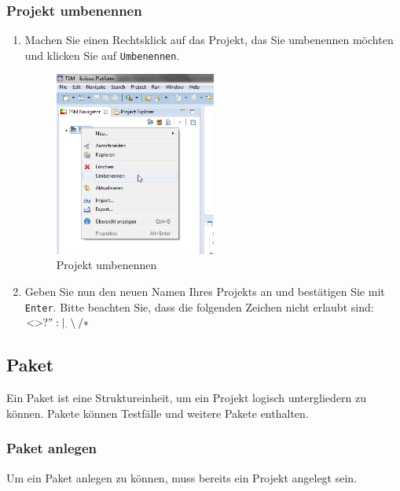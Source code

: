 \documentclass[11pt,a4paper,titlepage]{article}
\begin{document}
\subsubsection{Projekt umbenennen}
\begin{enumerate}
\item Machen Sie einen Rechtsklick auf das Projekt, das Sie umbenennen möchten und  klicken Sie auf \texttt{Umbenennen}.

\begin{figure}[H]
\centering
\includegraphics[width= 200px]{BilderHandbuchTSMNavigator/Projekt/ProjektUmbenennen.png}
\caption{Projekt umbenennen}
\label{fig:ProjektUmbenennen}
\end{figure}

\item Geben Sie nun den neuen Namen Ihres Projekts an und bestätigen Sie mit \texttt{Enter}. Bitte beachten Sie, dass die folgenden Zeichen nicht erlaubt sind: $ < > ? " : | _ . \setminus / *$
\end{enumerate}

\subsection{Paket}
Ein Paket ist eine Struktureinheit, um ein Projekt logisch untergliedern zu können. Pakete können Testfälle und weitere Pakete enthalten.

\subsubsection{Paket anlegen}
Um ein Paket anlegen zu können, muss bereits ein Projekt angelegt sein.
\linebreak
\end{document}
